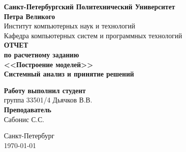 \begin{titlepage}
\begin{center}
	\textbf{Санкт-Петербургский Политехнический Университет \\Петра Великого}\\[0.3cm]
	\small Институт компьютерных наук и технологий \\[0.3cm]
	\small Кафедра компьютерных систем и программных технологий\\[4cm]
	
	\textbf{ОТЧЕТ}\\ \textbf{по расчетному заданию}\\[0.5cm]
	\textbf{<<Построение моделей>>}\\[0.1cm]
	\textbf{Системный анализ и принятие решений}\\[8.0cm]
\end{center}

\begin{flushright}
	\begin{minipage}{0.4\textwidth}
		\begin{flushleft}
			\small \textbf{Работу выполнил студент}\\[3mm]
			\small группа 33501/4 \hspace*{6mm} Дьячков В.В.\\[5mm]
			
			\small \textbf{Преподаватель}\\[5mm]
		 	\small \sign[3cm] \hspace*{5mm} Сабонис С.С.\\[0.5cm]
		\end{flushleft}
	\end{minipage}
\end{flushright}

\vfill

\begin{center}
	\small Санкт-Петербург\\
	\small \today
\end{center}
\end{titlepage}

\addtocounter{page}{1}
